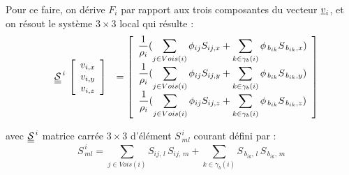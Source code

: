 Pour ce faire, on d\'erive $F_i$ par rapport aux trois composantes du vecteur $\underline{v}_i$,
et on r\'esout le syst\`eme $3\times3$ local qui r\'esulte :\\
\begin{equation}
\begin{array}{lll}
&\displaystyle \underline{\underline{\mathcal{S}}}^{\,i} \,
\left[\begin{array}{c}
v_{i,x} \\ v_{i,y} \\ v_{i,z}
\end{array}\right]
&=\left[\begin{array}{c}
\displaystyle
\frac{1}{\rho_i}(\sum\limits_{j\in Vois(i)}\phi_{ij}S_{ij,x} +\sum\limits_{k\in {\gamma_b(i)}}\phi_{\,b_{ik}}S_{{\,b_{ik}},x})\\
\displaystyle
\frac{1}{\rho_i}(\sum\limits_{j\in Vois(i)}\phi_{ij}S_{ij,y} +\sum\limits_{k\in {\gamma_b(i)}}\phi_{\,b_{ik}}S_{{\,b_{ik}},y})\\
\displaystyle
\frac{1}{\rho_i}(\sum\limits_{j\in Vois(i)}\phi_{ij}S_{ij,z} +\sum\limits_{k\in {\gamma_b(i)}}\phi_{\,b_{ik}}S_{{\,b_{ik}},z})
\end{array}\right]
\end{array}
\end{equation}

avec $\underline{\underline{\mathcal{S}}}^{\,i}$ matrice carr\'ee $3\times3$ d'\'el\'ement $S^{\,i}_{\,ml}$ courant d\'efini par :\\
\begin{equation}
S^{\,i}_{\,ml} = \sum\limits_{j\in Vois(i)}S_{ij,\,l}\,S_{ij,\,m} + \sum\limits_{k\in {\gamma_b(i)}}S_{{\,b_{ik}},\,l}\,S_{{\,b_{ik}},\,m}
\end{equation}


